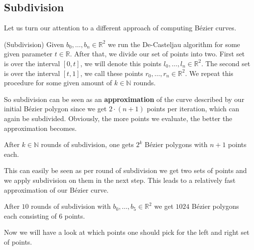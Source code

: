 \subsection{Subdivision}
Let us turn our attention to a different approach of computing Bézier curves.
\begin{definition}(Subdivision)
Given $b_0, \dots, b_n \in \mathbb{R}^2$ we run the De-Casteljau algorithm for some given parameter $t \in \mathbb{R}$. After that, we divide our set of points into two. First set is over the interval $[0,t]$, we will denote this points $l_0, \dots, l_n \in \mathbb{R}^2$. The second set is over the interval $[t,1]$, we call these points $r_0, \dots, r_n \in \mathbb{R}^2$. We repeat this procedure for some given amount of $k \in \mathbb{N}$ rounds.
\end{definition}
So subdivision can be seen as an \textbf{approximation} of the curve described by our initial Bézier polygon since we get $2\cdot(n+1)$ points per iteration, which can again be subdivided. Obviously, the more points we evaluate, the better the approximation becomes.
\begin{rem}
After $k \in \mathbb{N}$ rounds of subdivision, one gets $2^k$ Bézier polygons with $n+1$ points each.
\end{rem}
This can easily be seen as per round of subdivision we get two sets of points and we apply subdivision on them in the next step. This leads to a relatively fast approximation of our Bézier curve.
\begin{example}
After $10$ rounds of subdivision with $b_0, \dots, b_5 \in \mathbb{R}^2$ we get $1024$ Bézier polygons each consisting of $6$ points.
\end{example}
Now we will have a look at which points one should pick for the left and right set of points.
